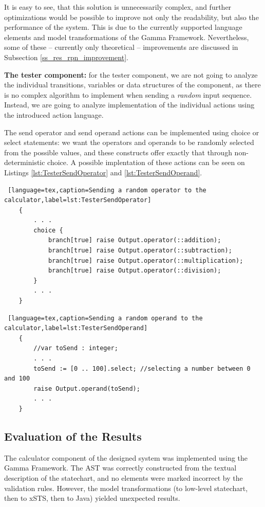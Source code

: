 It is easy to see, that this solution is unnecessarily complex, and further optimizations would be possible to improve not only the readability, but also the performance of the system. This is due to the currently supported language elements and model transformations of the Gamma Framework. Nevertheless, some of these -- currently only theoretical -- improvements are discussed in Subsection \ref{ss_res_rpn_improvement}.

\textbf{The tester component:} for the tester component, we are not going to analyze the individual transitions, variables or data structures of the component, as there is no complex algorithm to implement when sending a \textit{random} input sequence. Instead, we are going to analyze implementation of the individual actions using the introduced action language.

The send operator and send operand actions can be implemented using choice or select statements: we want the operators and operands to be randomly selected from the possible values, and these constructs offer exactly that through non-deterministic choice. A possible implentation of these actions can be seen on Listings \ref{lst:TesterSendOperator} and \ref{lst:TesterSendOperand}.

\bigskip
\begin{lstlisting} [language=tex,caption=Sending a random operator to the calculator,label=lst:TesterSendOperator]
	{
		. . .
		choice {
			branch[true] raise Output.operator(::addition);
			branch[true] raise Output.operator(::subtraction);
			branch[true] raise Output.operator(::multiplication);
			branch[true] raise Output.operator(::division);
		}
		. . .
	}
\end{lstlisting}
\bigskip
\begin{lstlisting} [language=tex,caption=Sending a random operand to the calculator,label=lst:TesterSendOperand]
	{
		//var toSend : integer;
		. . .
		toSend := [0 .. 100].select; //selecting a number between 0 and 100
		raise Output.operand(toSend);
		. . .
	}
\end{lstlisting}

\subsection{Evaluation of the Results}
The calculator component of the designed system was implemented using the Gamma Framework. The AST was correctly constructed from the textual description of the statechart, and no elements were marked incorrect by the validation rules. However, the model transformations (to low-level statechart, then to xSTS, then to Java) yielded unexpected results.

